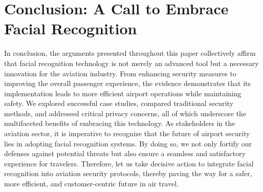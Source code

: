 \documentclass{article}%
\begin{document}
%
\section*{Conclusion: A Call to Embrace Facial Recognition}%
\label{sec:ConclusionACalltoEmbraceFacialRecognition}%
In conclusion, the arguments presented throughout this paper collectively affirm that facial recognition technology is not merely an advanced tool but a necessary innovation for the aviation industry. From enhancing security measures to improving the overall passenger experience, the evidence demonstrates that its implementation leads to more efficient airport operations while maintaining safety. We explored successful case studies, compared traditional security methods, and addressed critical privacy concerns, all of which underscore the multifaceted benefits of embracing this technology. As stakeholders in the aviation sector, it is imperative to recognize that the future of airport security lies in adopting facial recognition systems. By doing so, we not only fortify our defenses against potential threats but also ensure a seamless and satisfactory experience for travelers. Therefore, let us take decisive action to integrate facial recognition into aviation security protocols, thereby paving the way for a safer, more efficient, and customer{-}centric future in air travel.

%
\end{document}
